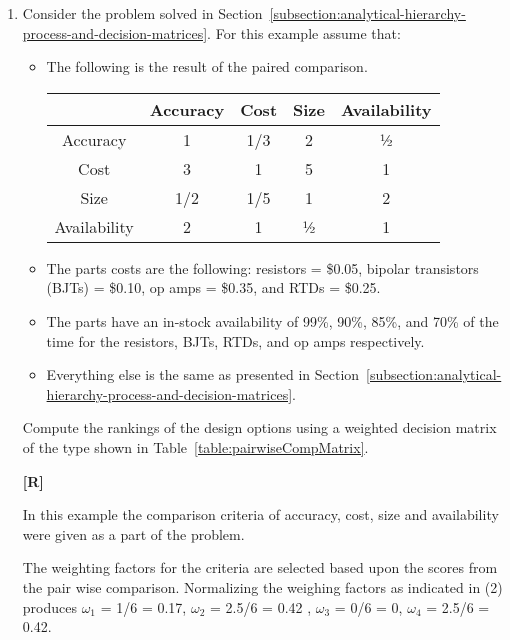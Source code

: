\begin{enumerate}
\item
  Consider the problem solved in 
  Section~\ref{subsection:analytical-hierarchy-process-and-decision-matrices}. 
  For this example assume   that:
\begin{itemize}

\item
  The following is the result of the paired comparison.

\begin{table}
\begin{tabular}{|c|c|c|c|c|}
\hline
              &
Accuracy &
Cost &
Size &
Availability \\ \hline
Accuracy & 1 & 1/3 & 2 & ½ \\ \hline
Cost & 3 & 1 & 5 & 1 \\ \hline
Size & 1/2 & 1/5 & 1 & 2 \\ \hline
Availability & 2 & 1 & ½ & 1 \\ \hline
\end{tabular}
\end{table}


\item
  The parts costs are the following: resistors = \$0.05, bipolar
  transistors (BJTs) = \$0.10, op amps = \$0.35, and RTDs = \$0.25.
\item
  The parts have an in-stock availability of 99\%, 90\%, 85\%, and 70\%
  of the time for the re­sistors, BJTs, RTDs, and op amps respectively.
\item
  Everything else is the same as presented in 
  Section~\ref{subsection:analytical-hierarchy-process-and-decision-matrices}.
\end{itemize}

Compute the rankings of the design options using a weighted decision
matrix of the type shown in Table~\ref{table:pairwiseCompMatrix}.

  \begin{onlysolution}
    \textbf{[R]}
    \itshape
    
    In this example the comparison criteria of accuracy, cost, size and 
    availability were given as a part of the problem.
    
    The weighting factors for the criteria are selected based upon the 
    scores from the pair wise comparison. Normalizing the weighing factors 
    as indicated in (2) produces $\omega_1$ = 1/6 = 0.17, $\omega_2$ = 2.5/6 = 0.42
    , $\omega_3$ = 0/6 = 0, $\omega_4$ = 2.5/6 = 0.42.
    

\end{onlysolution}
\end{enumerate}
